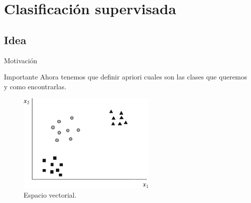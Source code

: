 \documentclass[handout]{beamer}
\begin{document}
\section{Clasificaci\'on supervisada}
\subsection{Idea}
\begin{frame}{Motivaci\'on}
  \begin{center}
    \end{center}
\end{frame}

\begin{frame}{\subsecname}
  \begin{alertblock}{Importante}
    Ahora tenemos que definir apriori cuales son las clases que queremos y como encontrarlas.
  \end{alertblock}
\end{frame}

\begin{frame}{\subsecname}
  \begin{figure}
  \includegraphics[width=0.6\textwidth]{imagenes/vector-3.png}
  \caption{Espacio vectorial.}
  \end{figure}
\end{frame}
\end{document}
